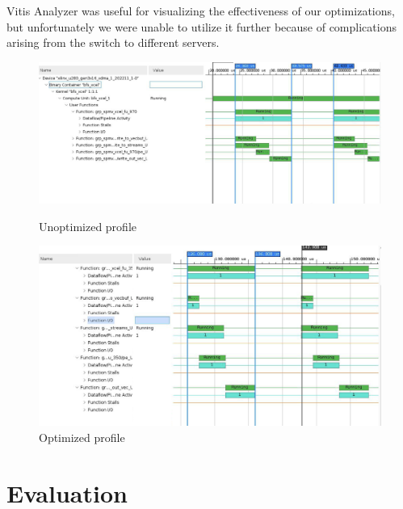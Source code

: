 \documentclass[10pt]{article}
\begin{document}
\noindent Vitis Analyzer was useful for visualizing the effectiveness of our optimizations, but unfortunately we
were unable to utilize it further because of complications arising from the switch to different servers.

\begin{figure}[h!]
  \centering
  \begin{minipage}[b]{0.8\textwidth}
    \includegraphics[width=\textwidth]{profile_unopt.png}
    \caption{Unoptimized profile}
    \label{fig:profile_unopt}
  \end{minipage}
  \hfill
  \begin{minipage}[b]{0.8\textwidth}
    \includegraphics[width=\textwidth]{profile_opt.png}
    \caption{Optimized profile}
    \label{fig:profile_opt}
  \end{minipage}
\end{figure}

\section{Evaluation}
\end{document}
